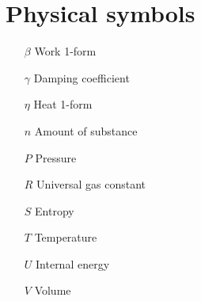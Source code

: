\section*{Physical symbols}
\begin{itemize}[itemsep=0pt, leftmargin=2cm, labelsep=0cm, labelwidth=1.9cm, align=left]
    \item[$\beta$] Work 1-form
    \item[$\gamma$] Damping coefficient
    \item[$\eta$] Heat 1-form
%
    \item[$n$] Amount of substance
    \item[$P$] Pressure
    \item[$R$] Universal gas constant
    \item[$S$] Entropy
    \item[$T$] Temperature
    \item[$U$] Internal energy
    \item[$V$] Volume
%
%
%
\end{itemize}